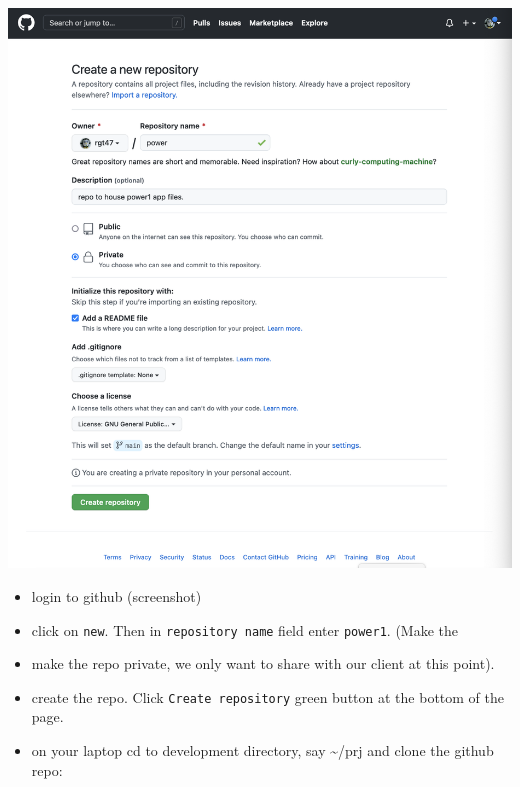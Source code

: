 \documentclass[
  letterpaper,
  DIV=11,
  numbers=noendperiod,
  oneside]{scrartcl}
\begin{document}
\begin{tcolorbox}[enhanced jigsaw, colbacktitle=quarto-callout-note-color!10!white, leftrule=.75mm, opacitybacktitle=0.6, toprule=.15mm, arc=.35mm, coltitle=black, left=2mm, bottomrule=.15mm, opacityback=0, bottomtitle=1mm, toptitle=1mm, titlerule=0mm, breakable, title=\textcolor{quarto-callout-note-color}{\faInfo}\hspace{0.5em}{Details for creating a Github repo follow:}, colback=white, colframe=quarto-callout-note-color-frame, rightrule=.15mm]

\begin{marginfigure}

{\centering \includegraphics{img/git1.png}

}

\end{marginfigure}

\begin{itemize}
\item
  login to github (screenshot)
\item
  click on \texttt{new}. Then in \texttt{repository\ name} field enter
  \texttt{power1}. (Make the
\item
  make the repo private, we only want to share with our client at this
  point).
\item
  create the repo. Click \texttt{Create\ repository} green button at the
  bottom of the page.
\item
  on your laptop cd to development directory, say \textasciitilde/prj
  and clone the github repo:
\end{itemize}


\end{tcolorbox}
\end{document}
